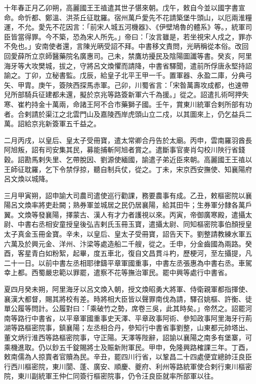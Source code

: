 
\begin{pinyinscope}

 十年春正月乙卯朔，高麗國王王禃遣其世子愖來朝。戊午，敕自今並以國字書宣命。命忻都、鄭溫、洪茶丘征耽羅。宿州萬戶愛先不花請築堡牛頭山，以厄兩淮糧運，不允。愛先不花因言：「前宋人城五河機器》、《伊壁鳩魯的體系》等。，統軍司臣皆當得罪。今不築，恐為宋人所先。」帝曰：「汝言雖是，若坐視宋人戍之，罪亦不免也。」安南使者還，言陳光昞受詔不拜。中書移文責問，光昞稱從本俗。改回回愛薛所立京師醫藥院名廣惠司。己未，禁鷹坊擾民及陰陽圖讖等書。癸亥，阿里海牙等大攻樊城，拔之，守將呂文煥懼而請降，中書省驛聞，遣前所俘唐永堅持詔諭之。丁卯，立秘書監。戊辰，給皇子北平王甲一千。置軍器、永盈二庫，分典弓矢、甲胄。庚午，簽陜西探馬赤軍。己卯，川蜀省言：「宋昝萬壽攻成都，也速帶兒所部騎兵征建都未還，擬於京兆等路簽新軍六千為援。」從之。詔遣扎術呵押失寒、崔杓持金十萬兩，命諸王阿不合市藥獅子國。壬午，賞東川統軍合剌所部有功者。合剌請於渠江之北雲門山及嘉陵西岸虎頭山立二戍，以其圖來上，仍乞益兵二萬。詔給京兆新簽軍五千益之。



 二月丙戌，以皇后、皇太子受冊寶，遣太常卿合丹告於太廟。丙申，雲南羅羽酋長阿旭叛，詔有司安集其民，募能捕斬阿旭者賞之。遣斷事官麥肖勾校川陜行省錢穀。詔勘馬剌失里、乞帶脫因、劉源使緬國，諭遣子弟近臣來朝。高麗國王王禃以王師征耽羅，乞下令禁俘掠，聽自制兵仗，從之。丁未，宋京西安撫使、知襄陽府呂文煥以城降。



 三月甲寅朔，詔申諭大司農司遣使巡行勸課，務要農事有成。乙丑，敕樞密院以襄陽呂文煥率將吏赴闕；熟券軍並城居之民仍居襄陽，給其田牛；生券軍分隸各萬戶翼。文煥等發襄陽，擇蒙古、漢人有才力者護視以來。丙寅，帝御廣寒殿，遣攝太尉、中書右丞相安童授皇後弘吉剌氏玉冊玉寶，遣攝太尉、同知樞密院事伯顏授皇太子真金玉冊金寶。辛未，以皇后、皇太子受冊寶，詔告天下。劉整請教練水軍五六萬及於興元金、洋州、汴梁等處造船二千艘，從之。壬申，分金齒國為兩路。癸酉，客星青白如粉絮，起畢，度五車北，復自文昌貫斗杓，歷梗河，至左攝提，凡二十一日。以前中書左丞相耶律鑄平章軍國重事，中書左丞張惠為中書右丞。車駕幸上都。西蜀嚴忠範以罪罷，遣察不花等撫治軍民。罷中興等處行中書省。



 夏四月癸未朔，阿里海牙以呂文煥入朝，授文煥昭勇大將軍、侍衛親軍都指揮使、襄漢大都督，賜其將校有差。時將相大臣皆以聲罪南伐為請，驛召姚樞、許衡、徒單公履等問計。公履對曰：「乘破竹之勢，席卷三吳，此其時矣。」帝然之。詔罷河南等路行中書省，以平章軍國重事史天澤、平章政事阿術、參知政事阿里海牙行荊湖等路樞密院事，鎮襄陽；左丞相合丹，參知行中書省事劉整，山東都元帥塔出、董文炳行淮西等路樞密院事，守正陽。天澤等陛辭，詔諭以襄陽之南多有堡寨，可乘機進取。仍以鈔五千錠賜將士及賑新附軍民。甲申，免隆興路榷課三年。丁酉，敕南儒為人掠賣者官贖為民。辛丑，罷四川行省，以鞏昌二十四處便宜總帥汪良臣行西川樞密院，東川閬、蓬、廣安、順慶、夔府、利州等路統軍使合剌行東川樞密院，東川副統軍王仲仁同簽行樞密院事，仍令汪良臣就率所部軍以往。




\end{pinyinscope}
